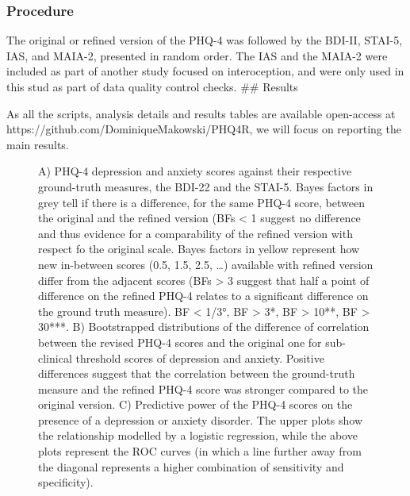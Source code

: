 \documentclass[
  jou,
  floatsintext,
  longtable,
  nolmodern,
  notxfonts,
  notimes,
  colorlinks=true,linkcolor=blue,citecolor=blue,urlcolor=blue]{apa7}
\begin{document}
\subsubsection{Procedure}\label{procedure-1}

The original or refined version of the PHQ-4 was followed by the BDI-II,
STAI-5, IAS, and MAIA-2, presented in random order. The IAS and the
MAIA-2 were included as part of another study focused on interoception,
and were only used in this stud as part of data quality control checks.
\#\# Results

As all the scripts, analysis details and results tables are available
open-access at https://github.com/DominiqueMakowski/PHQ4R, we will focus
on reporting the main results.

\begin{figure}[!htbp]

{\caption{{A) PHQ-4 depression and anxiety scores against their
respective ground-truth measures, the BDI-22 and the STAI-5. Bayes
factors in grey tell if there is a difference, for the same PHQ-4 score,
between the original and the refined version (BFs \textless{} 1 suggest
no difference and thus evidence for a comparability of the refined
version with respect fo the original scale. Bayes factors in yellow
represent how new in-between scores (0.5, 1.5, 2.5, \ldots) available
with refined version differ from the adjacent scores (BFs \textgreater{}
3 suggest that half a point of difference on the refined PHQ-4 relates
to a significant difference on the ground truth measure). BF \textless{}
1/3°, BF \textgreater{} 3*, BF \textgreater{} 10**, BF \textgreater{}
30***. B) Bootstrapped distributions of the difference of correlation
between the revised PHQ-4 scores and the original one for sub-clinical
threshold scores of depression and anxiety. Positive differences suggest
that the correlation between the ground-truth measure and the refined
PHQ-4 score was stronger compared to the original version. C) Predictive
power of the PHQ-4 scores on the presence of a depression or anxiety
disorder. The upper plots show the relationship modelled by a logistic
regression, while the above plots represent the ROC curves (in which a
line further away from the diagonal represents a higher combination of
sensitivity and specificity).}{\label{fig-two}}}}


\end{figure}
\end{document}
